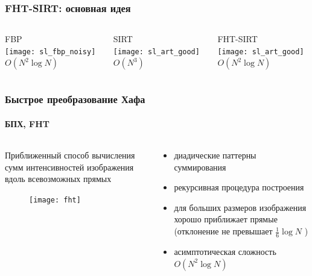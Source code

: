 
\begin{frame}
\frametitle{FHT-SIRT: основная идея}
\centering
\begin{columns}
\begin{column}{0.35\textwidth}
\centering
FBP\\
\vspace{20pt}
\texttt{[image: sl\_fbp\_noisy]}\\
\vspace{20pt}
$O(N^2 \log N)$
\end{column}
\vrule{}
\begin{column}{0.35\textwidth}
\centering
SIRT\\
\vspace{20pt}
\texttt{[image: sl\_art\_good]}\\
\vspace{20pt}
$O(N^3)$
\end{column}
\vrule{}
\begin{column}{0.35\textwidth}
\centering
FHT-SIRT\\
\vspace{20pt}
\texttt{[image: sl\_art\_good]}\\
\vspace{20pt}
$O(N^2 \log N)$
\end{column}
\end{columns}
\end{frame}

\begin{frame}
\frametitle{Быстрое преобразование Хафа}
\framesubtitle{БПХ, FHT}
\begin{columns}[T,onlytextwidth]
  \hspace*{-0.5cm}
  \begin{column}{0.65\textwidth}
  Приближенный способ вычисления сумм интенсивностей изображения вдоль всевозможных прямых
  \begin{figure}
    \texttt{[image: fht]}
  \end{figure}
  \end{column}
  \begin{column}{0.45\textwidth}
  \begin{itemize}
    \item диадические паттерны суммирования
    \item рекурсивная процедура построения
    \item для больших размеров изображения хорошо приближает прямые (отклонение не превышает  $\frac 1 6 \log N$ ) %
    \item асимптотическая сложность $O(N^2 \log N)$
  \end{itemize}
  \end{column}
\end{columns}

\end{frame}

